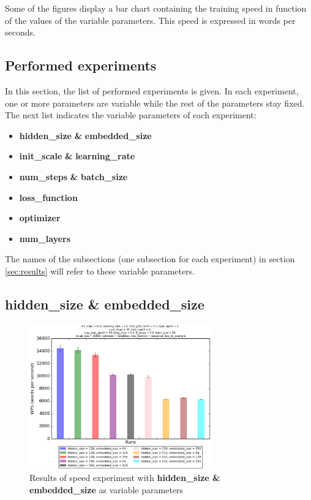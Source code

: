 \documentclass[10pt,a4paper,titlepage]{article}
\begin{document}
\noindent
Some of the figures display a bar chart containing the training speed in function of the values of the variable parameters. This speed is expressed in words per seconds.

\subsection{Performed experiments}
\label{subsec:perf}

In this section, the list of performed experiments is given. In each experiment, one or more parameters are variable while the rest of the parameters stay fixed. The next list indicates the variable parameters of each experiment:

\begin{itemize}
	
	\item \textbf{hidden\_size} \textbf{\&} \textbf{embedded\_size}
	\item \textbf{init\_scale} \textbf{\&} \textbf{learning\_rate}
	\item \textbf{num\_steps} \textbf{\&} \textbf{batch\_size}
	\item \textbf{loss\_function}
	\item \textbf{optimizer}
	\item \textbf{num\_layers}
	
\end{itemize}

\noindent
The names of the subsections (one subsection for each experiment) in section \ref{sec:results} will refer to these variable parameters.

\subsection{hidden\_size \& embedded\_size}

\begin{figure}[H]
	\begin{center}
		\includegraphics[width=0.70\textwidth]{hidembspeed.eps}
		\caption{Results of speed experiment with \textbf{hidden\_size \& embedded\_size} as variable parameters}
		\label{fig:exp1speed}
	\end{center}	
\end{figure}
\end{document}
